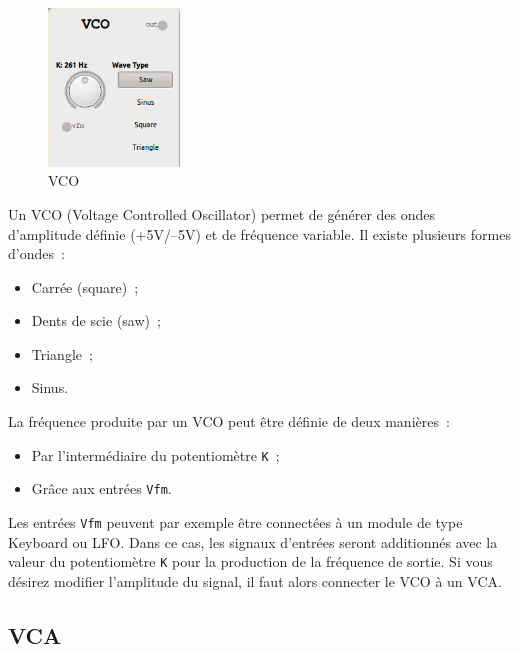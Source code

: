\documentclass[a4paper,oneside,frenchb,10pt]{article}
\begin{document}
\begin{multicols}{2}
\begin{figure}[H]
\centering
\includegraphics[width=3.5cm]{../img/png/vco.png}
\caption{VCO}
\end{figure}

Un VCO (Voltage Controlled Oscillator) permet de générer des ondes
d'amplitude définie (+5V/--5V) et de fréquence variable. Il existe
plusieurs formes d'ondes~:

\begin{itemize}
\item
  Carrée (square)~;
\item
  Dents de scie (saw)~;
\item
  Triangle~;
\item
  Sinus.
\end{itemize}

La fréquence produite par un VCO peut être définie de deux manières~:

\begin{itemize}
\item
  Par l'intermédiaire du potentiomètre \verb!K!~;
\item
  Grâce aux entrées \verb!Vfm!.
\end{itemize}
\end{multicols}

Les entrées \verb!Vfm! peuvent par exemple être connectées à un module
de type Keyboard ou LFO. Dans ce cas, les signaux d'entrées seront
additionnés avec la valeur du potentiomètre \verb!K! pour la production
de la fréquence de sortie. Si vous désirez modifier l'amplitude du
signal, il faut alors connecter le VCO à un VCA.

\subsection{VCA}
\end{document}
